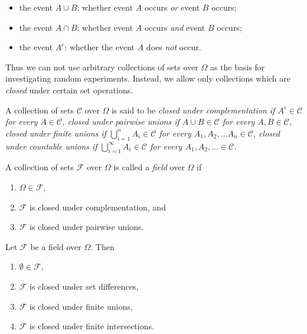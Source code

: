 \begin{itemize}
\item the event $A\cup B$: whether event $A$ occurs \emph{or} event $B$ occurs;
\item the event $A\cap B$: whether event $A$ occurs \emph{and} event $B$ occurs;
\item the event $A^c$: whether the event $A$ does \emph{not} occur.
\end{itemize}

\smallskip
Thus we can not use arbitrary collections of sets over $\Omega$ as the basis for investigating random experiments. Instead, we allow only collections which are \emph{closed} under certain set operations.

\begin{definition}
A collection of sets $\mathcal{C}$ over $\Omega$ is said to be
\ben
\it \emph{closed under complementation} if $A^c\in\mathcal{C}$ for every $A\in\mathcal{C}$, 
\it \emph{closed under pairwise unions} if $A\cup B\in\mathcal{C}$ for every $A,B\in\mathcal{C}$, 
\it \emph{closed under finite unions}	if $\bigcup_{i=1}^{n} A_i\in\mathcal{C}$ for every $A_1,A_2,\ldots A_n\in\mathcal{C}$,
\it \emph{closed under countable unions} if $\bigcup_{i=1}^{\infty} A_i\in\mathcal{C}$ for every $A_1,A_2,\ldots\in\mathcal{C}$.
\een
\end{definition}

\begin{definition}
A collection of sets $\mathcal{F}$ over $\Omega$ is called a \emph{field} over $\Omega$ if
\begin{enumerate}
\item $\Omega\in\mathcal{F}$,
\item $\mathcal{F}$ is closed under complementation, and
\item $\mathcal{F}$ is closed under pairwise unions.
\end{enumerate}
\end{definition}

\begin{theorem}
Let $\mathcal{F}$ be a field over $\Omega$. Then
\begin{enumerate}
\item $\emptyset\in\mathcal{F}$,
\item $\mathcal{F}$ is closed under set differences,
\item $\mathcal{F}$ is closed under finite unions,
\item $\mathcal{F}$ is closed under finite intersections.
\end{enumerate}
\end{theorem}

